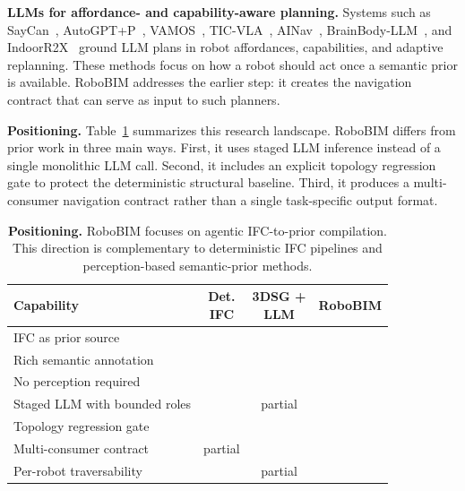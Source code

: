 \documentclass[a4paper, 10pt, conference]{ieeeconf}
\newcommand{\cmark}{\ding{51}}
\newcommand{\xmark}{\ding{55}}
\begin{document}
\textbf{LLMs for affordance- and capability-aware planning.} Systems such as SayCan~\cite{ahn2022saycan}, AutoGPT+P~\cite{birr2024autogptp}, VAMOS~\cite{vamos2025}, TIC-VLA~\cite{huang2026ticvla}, AINav~\cite{ainav2025}, BrainBody-LLM~\cite{brainbody2025}, and IndoorR2X~\cite{indoorr2x2026} ground LLM plans in robot affordances, capabilities, and adaptive replanning. These methods focus on how a robot should act once a semantic prior is available. RoboBIM addresses the earlier step: it creates the navigation contract that can serve as input to such planners.

\textbf{Positioning.} Table~\ref{tab:gap} summarizes this research landscape. RoboBIM differs from prior work in three main ways. First, it uses staged LLM inference instead of a single monolithic LLM call. Second, it includes an explicit topology regression gate to protect the deterministic structural baseline. Third, it produces a multi-consumer navigation contract rather than a single task-specific output format.

\begin{table}[t]
\centering
\caption{\textbf{Positioning.} RoboBIM focuses on agentic IFC-to-prior compilation. This direction is complementary to deterministic IFC pipelines and perception-based semantic-prior methods.}
\label{tab:gap}
\footnotesize
\setlength{\tabcolsep}{3pt}
\begin{tabularx}{\columnwidth}{@{}X c c c@{}}
\toprule
\textbf{Capability} & \makecell{\textbf{Det.}\\\textbf{IFC}} & \makecell{\textbf{3DSG +}\\\textbf{LLM}} & \textbf{RoboBIM} \\
\midrule
IFC as prior source             & \cmark & \xmark & \cmark \\
Rich semantic annotation        & \xmark & \cmark & \cmark \\
No perception required          & \cmark & \xmark & \cmark \\
Staged LLM with bounded roles   & \xmark & partial & \cmark \\
Topology regression gate        & \xmark & \xmark & \cmark \\
Multi-consumer contract         & partial & \xmark & \cmark \\
Per-robot traversability        & \xmark & partial & \cmark \\
\bottomrule
\end{tabularx}
\end{table}
\end{document}
